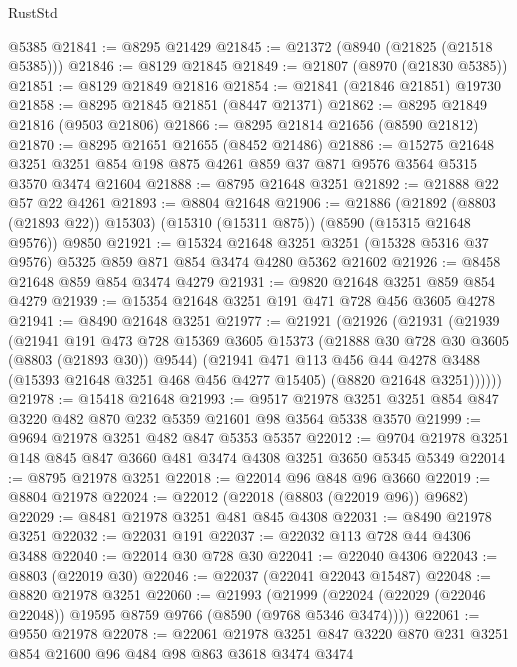 \begin{lexlean}{RustStd}
\begin{coremodule}
    @5385
@21841 := @8295 @21429
@21845 := @21372 (@8940 (@21825 (@21518 @5385)))
@21846 := @8129 @21845
@21849 := @21807 (@8970 (@21830 @5385))
@21851 := @8129 @21849 @21816
@21854 := @21841 (@21846 @21851) @19730
@21858 := @8295 @21845 @21851 (@8447 @21371)
@21862 := @8295 @21849 @21816 (@9503 @21806)
@21866 := @8295 @21814 @21656 (@8590 @21812)
@21870 := @8295 @21651 @21655 (@8452 @21486)
@21886 := @15275
    @21648
    @3251
    @3251
    @854
    @198
    @875
    @4261
    @859
    @37
    @871
    @9576
    @3564
    @5315
    @3570
    @3474
    @21604
@21888 := @8795 @21648 @3251
@21892 := @21888 @22 @57 @22 @4261
@21893 := @8804 @21648
@21906 := @21886
    (@21892 (@8803 (@21893 @22)) @15303)
    (@15310 (@15311 @875))
    (@8590 (@15315 @21648 @9576))
    @9850
@21921 := @15324
    @21648
    @3251
    @3251
    (@15328 @5316 @37 @9576)
    @5325
    @859
    @871
    @854
    @3474
    @4280
    @5362
    @21602
@21926 := @8458 @21648 @859 @854 @3474 @4279
@21931 := @9820 @21648 @3251 @859 @854 @4279
@21939 := @15354 @21648 @3251 @191 @471 @728 @456 @3605 @4278
@21941 := @8490 @21648 @3251
@21977 := @21921
    (@21926
      (@21931
        (@21939
          (@21941
            @191
            @473
            @728
            @15369
            @3605
            @15373
            (@21888 @30 @728 @30 @3605 (@8803 (@21893 @30)) @9544)
            (@21941
              @471
              @113
              @456
              @44
              @4278
              @3488
              (@15393 @21648 @3251 @468 @456 @4277 @15405)
              (@8820 @21648 @3251))))))
@21978 := @15418 @21648
@21993 := @9517 @21978 @3251 @3251 @854 @847 @3220 @482 @870 @232 @5359 @21601 @98 @3564 @5338 @3570
@21999 := @9694 @21978 @3251 @482 @847 @5353 @5357
@22012 := @9704 @21978 @3251 @148 @845 @847 @3660 @481 @3474 @4308 @3251 @3650 @5345 @5349
@22014 := @8795 @21978 @3251
@22018 := @22014 @96 @848 @96 @3660
@22019 := @8804 @21978
@22024 := @22012 (@22018 (@8803 (@22019 @96)) @9682)
@22029 := @8481 @21978 @3251 @481 @845 @4308
@22031 := @8490 @21978 @3251
@22032 := @22031 @191
@22037 := @22032 @113 @728 @44 @4306 @3488
@22040 := @22014 @30 @728 @30
@22041 := @22040 @4306
@22043 := @8803 (@22019 @30)
@22046 := @22037 (@22041 @22043 @15487)
@22048 := @8820 @21978 @3251
@22060 := @21993
    (@21999 (@22024 (@22029 (@22046 @22048)) @19595 @8759 @9766 (@8590 (@9768 @5346 @3474))))
@22061 := @9550 @21978
@22078 := @22061
    @21978
    @3251
    @847
    @3220
    @870
    @231
    @3251
    @854
    @21600
    @96
    @484
    @98
    @863
    @3618
    @3474
    @3474

\end{coremodule}
\end{lexlean}
